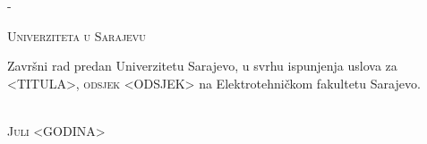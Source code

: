 \begin{titlingpage}
\begin{SingleSpace}
\begin{adjustwidth*}{\unitlength}{-\unitlength}
\begin{center}
{\textsc{Univerziteta u Sarajevu}}\\
\vspace{11mm}
\begin{minipage}{10cm}
Završni rad predan Univerzitetu Sarajevo, u svrhu ispunjenja uslova za \textsc{<TITULA>, odsjek <ODSJEK>} na Elektrotehničkom fakultetu Sarajevo.
\end{minipage}\\
\vspace{9mm}
{\large\textsc{Juli <GODINA>}}
\vspace{12mm}
\end{center}
\end{adjustwidth*}
\end{SingleSpace}
\end{titlingpage}